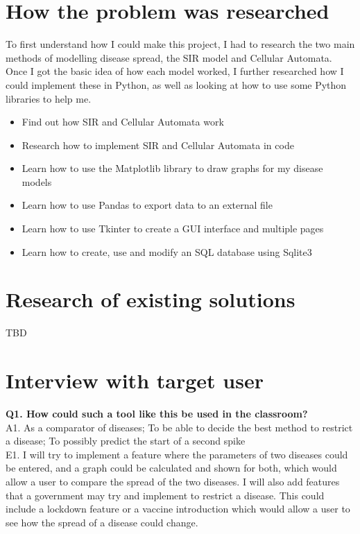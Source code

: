 \documentclass[11pt, a4paper]{article}
\begin{document}
\section{How the problem was researched}
To first understand how I could make this project, I had to research the two main methods of modelling disease spread, the SIR model and Cellular Automata. Once I got the basic idea of how each model worked, I further researched how I could implement these in Python, as well as looking at how to use some Python libraries to help me.
\begin{itemize}
    \item Find out how SIR and Cellular Automata work
    \item Research how to implement SIR and Cellular Automata in code
    \item Learn how to use the Matplotlib library to draw graphs for my disease models
    \item Learn how to use Pandas to export data to an external file
    \item Learn how to use Tkinter to create a GUI interface and multiple pages
    \item Learn how to create, use and modify an SQL database using Sqlite3
\end{itemize}



\section{Research of existing solutions}
TBD



\section{Interview with target user}
\textbf{Q1. How could such a tool like this be used in the classroom?}\\
A1. As a comparator of diseases; To be able to decide the best method to restrict a disease; To possibly predict the start of a second spike\\
E1. I will try to implement a feature where the parameters of two diseases could be entered, and a graph could be calculated and shown for both, which would allow a user to compare the spread of the two diseases. I will also add features that a government may try and implement to restrict a disease. This could include a lockdown feature or a vaccine introduction which would allow a user to see how the spread of a disease could change.
\end{document}
